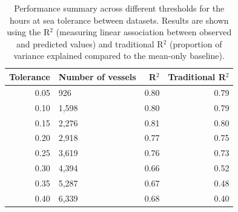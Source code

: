 \begin{table}[!h]
\centering
\caption{\label{tab:tab-performance-tolerance-table}Performance summary across different thresholds for the hours at sea tolerance between datasets. Results are shown using the R$^{2}$ (measuring linear association between observed and predicted values) and traditional R$^{2}$ (proportion of variance explained compared to the mean-only baseline).}
\centering
\fontsize{8}{10}\selectfont
\begin{tabular}[t]{r|l|r|r}
\hline
Tolerance & Number of vessels & R$^{2}$ & Traditional R$^{2}$\\
\hline
0.05 & 926 & 0.80 & 0.79\\
\hline
0.10 & 1,598 & 0.80 & 0.79\\
\hline
0.15 & 2,276 & 0.81 & 0.80\\
\hline
0.20 & 2,918 & 0.77 & 0.75\\
\hline
0.25 & 3,619 & 0.76 & 0.73\\
\hline
0.30 & 4,394 & 0.66 & 0.52\\
\hline
0.35 & 5,287 & 0.67 & 0.48\\
\hline
0.40 & 6,339 & 0.68 & 0.40\\
\hline
\end{tabular}
\end{table}
